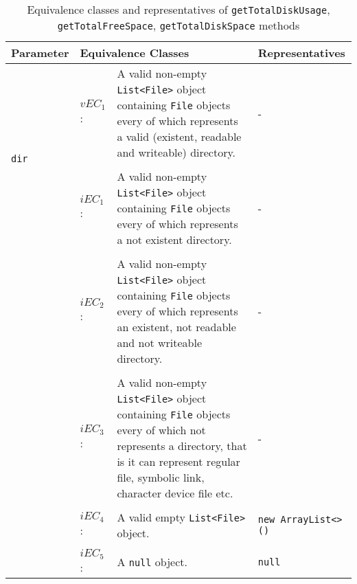 \documentclass[sigchi]{acmart}
\begin{document}
\begin{table*}
  \caption{Equivalence classes and representatives of \texttt{getTotalDiskUsage}, \texttt{getTotalFreeSpace}, \texttt{getTotalDiskSpace} methods}
  \label{tab:libraries}
  \begin{tabular}{llp{10cm}p{5cm}}
    \toprule
    \textbf{Parameter} & \multicolumn{2}{|l|}{\textbf{Equivalence Classes}} & \textbf{Representatives} \\
    \midrule
    
	\multirow{4}{*}{\texttt{dir}} & $vEC_1$: & A valid non-empty \texttt{List<File>} object containing \texttt{File} objects every of which represents a valid (existent, readable and writeable) directory. & - \\    
    
    \\[-1em] 
    & $iEC_1$: & A valid non-empty \texttt{List<File>} object containing \texttt{File} objects every of which represents a not existent directory. & - \\ 
    
    \\[-1em] 
    & $iEC_2$: & A valid non-empty \texttt{List<File>} object containing \texttt{File} objects every of which represents an existent, not readable and not writeable directory. & - \\ 
    
    \\[-1em] 
    & $iEC_3$: & A valid non-empty \texttt{List<File>} object containing \texttt{File} objects every of which not represents a directory, that is it can represent regular file, symbolic link, character device file etc. & - \\ 
    
    \\[-1em]
    & $iEC_4$: & A valid empty \texttt{List<File>} object. & \texttt{new ArrayList<>()} \\
    
	\\[-1em]
    & $iEC_5$: & A \texttt{null} object. & \texttt{null} \\     
    
    \bottomrule
  \end{tabular}
\end{table*}



%
%

\appendix
\end{document}
